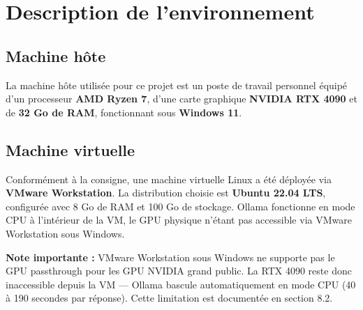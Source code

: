 \documentclass[12pt,a4paper]{report}
\begin{document}
\tableofcontents
\newpage

\listoffigures
\newpage

\chapter{Description de l'environnement}

\section{Machine hôte}

La machine hôte utilisée pour ce projet est un poste de travail personnel équipé
d'un processeur \textbf{AMD Ryzen 7}, d'une carte graphique \textbf{NVIDIA RTX 4090}
et de \textbf{32 Go de RAM}, fonctionnant sous \textbf{Windows 11}.

\section{Machine virtuelle}

Conformément à la consigne, une machine virtuelle Linux a été déployée via
\textbf{VMware Workstation}. La distribution choisie est \textbf{Ubuntu 22.04 LTS},
configurée avec 8 Go de RAM et 100 Go de stockage. Ollama fonctionne en mode CPU
à l'intérieur de la VM, le GPU physique n'étant pas accessible via VMware Workstation
sous Windows.

\begin{infobox}
\textbf{Note importante :} VMware Workstation sous Windows ne supporte pas le GPU
passthrough pour les GPU NVIDIA grand public. La RTX 4090 reste donc inaccessible
depuis la VM — Ollama bascule automatiquement en mode CPU (40 à 190 secondes par
réponse). Cette limitation est documentée en section 8.2.
\end{infobox}

\vspace{8pt}
\end{document}
